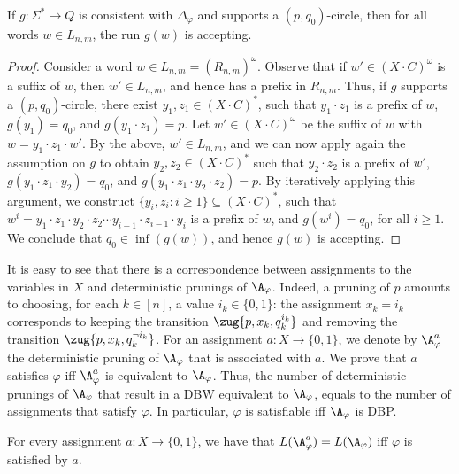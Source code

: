 \documentclass{lmcs}
\begin{document}
\begin{lem}\label{criterion for Lnm winning strategy}
	If $g:\Sigma^*\rightarrow Q$ is consistent with $\Delta_\varphi$ and supports a $(p,q_0)$-circle, then for all words $w\in L_{n,m}$, the run $g(w)$ is accepting.
\end{lem}

\begin{proof}
	Consider a word $w\in L_{n,m}=(R_{n,m})^\omega$. Observe that if $w'\in (X\cdot C)^\omega$ is a suffix of $w$, then $w'\in L_{n,m}$, and hence has a prefix in $R_{n,m}$. Thus, if $g$ supports a $(p,q_0)$-circle, there exist $y_1,z_1\in (X\cdot C)^*$, such that $y_1\cdot z_1$ is a prefix of $w$, $g(y_1)=q_0$, and $g(y_1\cdot z_1)=p$. Let $w' \in (X\cdot C)^\omega$ be the suffix of $w$ with $w=y_1\cdot z_1\cdot w'$. By the above, $w'\in L_{n,m}$, and we can now apply again the assumption on $g$ to obtain $y_2,z_2\in (X\cdot C)^*$ such that $y_2\cdot z_2$ is a prefix of $w'$, $g(y_1\cdot z_1\cdot y_2)=q_0$, and $g(y_1\cdot z_1\cdot y_2\cdot z_2)=p$. By iteratively applying this argument, we construct $\{y_i,z_i:i\geq 1\}\subseteq (X\cdot C)^*$, such that $w^i=y_1\cdot z_1\cdot y_2\cdot z_2\cdots y_{i-1}\cdot z_{i-1}\cdot y_i$ is a prefix of $w$, and $g(w^i)=q_0$, for all $i\geq 1$. We conclude that $q_0\in \inf (g(w))$, and hence $g(w)$ is accepting.
\end{proof}

It is easy to see that there is a correspondence between assignments to the variables in $X$ and deterministic prunings of $ \A_\varphi $. Indeed, a pruning of $p$ amounts  to choosing, for each $ k\in [n]$, a value $ i_k\in {\{0,1\}} $: the assignment $x_k=i_k $ corresponds to keeping the transition $ \zug{p,x_k,q^{i_k}_k} $ and removing the transition $ \zug{p,x_k,q^{\lnot i_k}_k} $. For an assignment $a:X \rightarrow {\{0,1\}}$, we denote by $\A_\varphi^{a}$ the deterministic pruning of $\A_\varphi$ that is associated with $a$. We prove that $a$ satisfies $\varphi$ iff $\A_\varphi^{a}$ is equivalent to $\A_\varphi$. Thus, the number of deterministic prunings of $\A_\varphi$ that result in a DBW equivalent to $\A_\varphi$, equals to the number of assignments that satisfy $\varphi$. In particular, $\varphi$ is satisfiable iff $\A_\varphi$ is DBP. 

\begin{prop}
For every assignment $a	:X \rightarrow {\{0,1\}}$, we have that $ L(\A^{a}_\varphi)=L(\A_\varphi) $ iff $ \varphi  $ is satisfied by $a$.
\end{prop}
\end{document}
